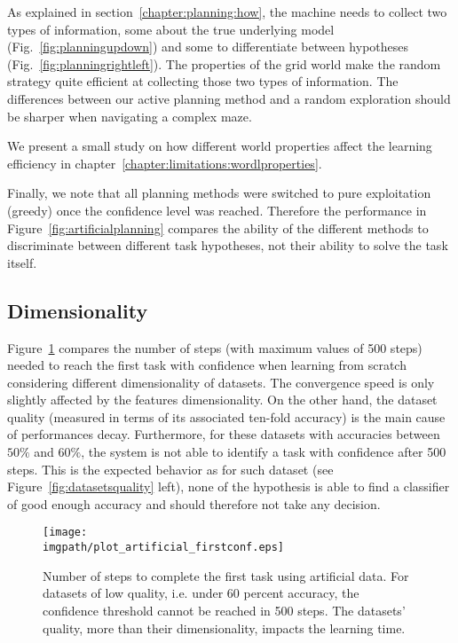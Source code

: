 As explained in section~\ref{chapter:planning:how}, the machine needs to collect two types of information, some about the true underlying model (Fig.~\ref{fig:planningupdown}) and some to differentiate between hypotheses (Fig.~\ref{fig:planningrightleft}). The properties of the grid world make the random strategy quite efficient at collecting those two types of information. The differences between our active planning method and a random exploration should be sharper when navigating a complex maze.

We present a small study on how different world properties affect the learning efficiency in chapter~\ref{chapter:limitations:wordlproperties}.

Finally, we note that all planning methods were switched to pure exploitation (greedy) once the confidence level was reached. Therefore the performance in Figure~\ref{fig:artificialplanning} compares the ability of the different methods to discriminate between different task hypotheses, not their ability to solve the task itself.

\subsection{Dimensionality}

Figure~\ref{fig:firstArtificial} compares the number of steps (with maximum values of 500 steps) needed to reach the first task with confidence when learning from scratch considering different dimensionality of datasets. The convergence speed is only slightly affected by the features dimensionality. On the other hand, the dataset quality (measured in terms of its associated ten-fold accuracy) is the main cause of performances decay. Furthermore, for these datasets with accuracies between $50\%$ and $60\%$, the system is not able to identify a task with confidence after 500 steps. This is the expected behavior as for such dataset (see Figure~\ref{fig:datasetsquality} left), none of the hypothesis is able to find a classifier of good enough accuracy and should therefore not take any decision.

\begin{figure}[!htbp]
  \centering
      \texttt{[image: \\imgpath/plot\_artificial\_firstconf.eps]}
      \caption{Number of steps to complete the first task using artificial data. For datasets of low quality, i.e. under 60 percent accuracy, the confidence threshold cannot be reached in 500 steps. The datasets' quality, more than their dimensionality, impacts the learning time.}
      \label{fig:firstArtificial}
\end{figure} 

